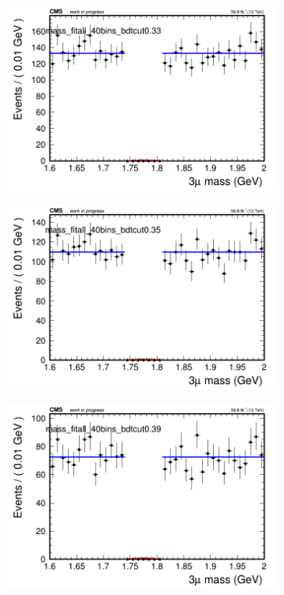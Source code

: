 \begin{figure}[H]
\begin{subfigure}{0.2\textwidth}
        \caption{}
    \end{subfigure}
    \begin{subfigure}{0.2\textwidth}
        \includegraphics[width=\textwidth]{flat_fit/plots/all/massfit_all_40bins_bdtcut0.33.png}
        \caption{}
    \end{subfigure}
    \begin{subfigure}{0.2\textwidth}
        \includegraphics[width=\textwidth]{flat_fit/plots/all/massfit_all_40bins_bdtcut0.35.png}
        \caption{}
    \end{subfigure}
    \begin{subfigure}{0.2\textwidth}
        \includegraphics[width=\textwidth]{flat_fit/plots/all/massfit_all_40bins_bdtcut0.39.png}

\end{subfigure}
\end{figure}
